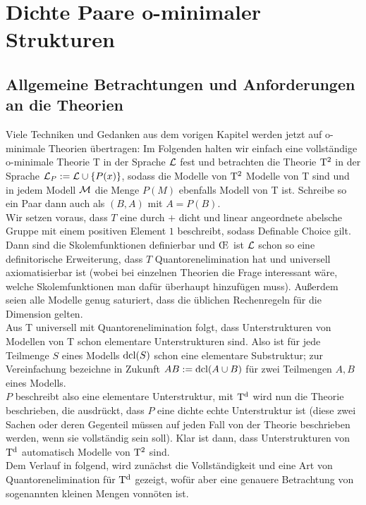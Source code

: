 \chapter{Dichte Paare o-minimaler Strukturen}
\section{Allgemeine Betrachtungen und Anforderungen an die Theorien}

Viele Techniken und Gedanken aus dem vorigen Kapitel werden jetzt auf o-minimale Theorien übertragen: Im Folgenden halten wir einfach eine vollständige o-minimale Theorie T in der Sprache $\mathcal{L}$ fest und betrachten die Theorie $\operatorname{T^2}$ in der Sprache $\mathcal{L}_P:=\mathcal{L}\cup\{P(x)\}$, sodass die Modelle von $\operatorname{T^2}$ Modelle von T sind und in jedem Modell $\mathcal{M}$ die Menge $P(M)$ ebenfalls Modell von T ist. Schreibe so ein Paar dann auch als $(B,A)$ mit $A=P(B)$.\\
Wir setzen voraus, dass $T$ eine durch $+$ dicht und linear angeordnete abelsche Gruppe mit einem positiven Element $1$ beschreibt, sodass Definable Choice gilt. Dann sind die Skolemfunktionen definierbar und \OE\ ist $\mathcal{L}$ schon so eine definitorische Erweiterung, dass $T$ Quantorenelimination hat und universell axiomatisierbar ist (wobei bei einzelnen Theorien die Frage interessant wäre, welche Skolemfunktionen man dafür überhaupt hinzufügen muss). Außerdem seien alle Modelle genug saturiert, dass die üblichen Rechenregeln für die Dimension gelten.\\
Aus T universell mit Quantorenelimination folgt, dass Unterstrukturen von Modellen von T schon elementare Unterstrukturen sind. Also ist für jede Teilmenge $S$ eines Modells $\operatorname{dcl}(S)$ schon eine elementare Substruktur; zur Vereinfachung bezeichne in Zukunft $AB:=\operatorname{dcl}(A\cup B)$ für zwei Teilmengen $A,B$ eines Modells.\\
$P$ beschreibt also eine elementare Unterstruktur, mit $\operatorname{T^d}$ wird nun die Theorie beschrieben, die ausdrückt, dass $P$ eine dichte echte Unterstruktur ist (diese zwei Sachen oder deren Gegenteil müssen auf jeden Fall von der Theorie beschrieben werden, wenn sie vollständig sein soll). Klar ist dann, dass Unterstrukturen von $\operatorname{T^d}$ automatisch Modelle von $\operatorname{T^2}$ sind.\\
Dem Verlauf in \cite{VanDenDries} folgend, wird zunächst die Vollständigkeit und eine Art von Quantorenelimination für $\operatorname{T^d}$ gezeigt, wofür aber eine genauere Betrachtung von sogenannten kleinen Mengen vonnöten ist.

